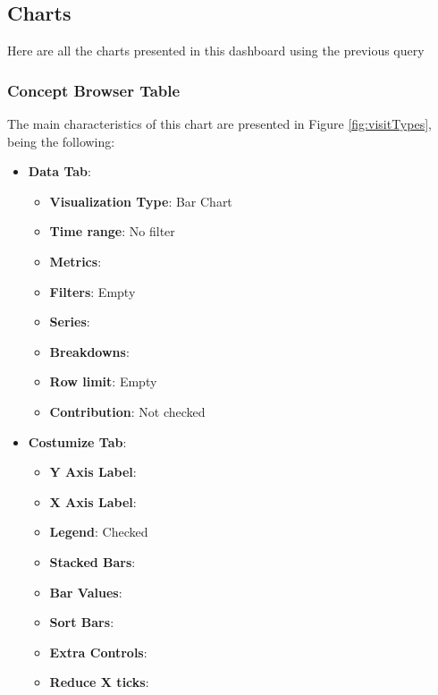 \documentclass[]{book}
\providecommand{\tightlist}{%
  \setlength{\itemsep}{0pt}\setlength{\parskip}{0pt}}
\begin{document}
\subsection{Charts}\label{charts}

Here are all the charts presented in this dashboard using the previous
query

\subsubsection{Concept Browser Table}\label{concept-browser-table}

The main characteristics of this chart are presented in Figure
\ref{fig:visitTypes}, being the following:

\begin{itemize}
\tightlist
\item
  \textbf{Data Tab}:

  \begin{itemize}
  \tightlist
  \item
    \textbf{Visualization Type}: Bar Chart
  \item
    \textbf{Time range}: No filter
  \item
    \textbf{Metrics}:
  \item
    \textbf{Filters}: Empty
  \item
    \textbf{Series}:
  \item
    \textbf{Breakdowns}:
  \item
    \textbf{Row limit}: Empty
  \item
    \textbf{Contribution}: Not checked
  \end{itemize}
\item
  \textbf{Costumize Tab}:

  \begin{itemize}
  \tightlist
  \item
    \textbf{Y Axis Label}:
  \item
    \textbf{X Axis Label}:
  \item
    \textbf{Legend}: Checked
  \item
    \textbf{Stacked Bars}:
  \item
    \textbf{Bar Values}:
  \item
    \textbf{Sort Bars}:
  \item
    \textbf{Extra Controls}:
  \item
    \textbf{Reduce X ticks}:
  \end{itemize}
\end{itemize}
\end{document}
